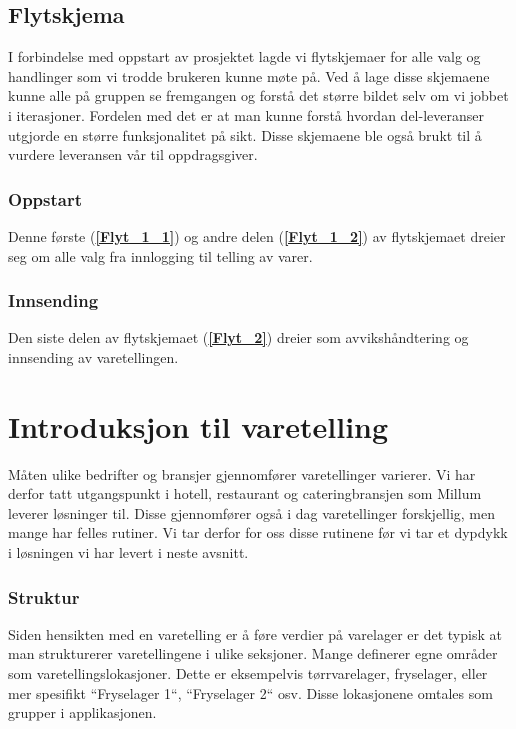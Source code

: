 \subsection{\textbf{Flytskjema}}
I forbindelse med oppstart av prosjektet lagde vi flytskjemaer for alle valg og handlinger som vi trodde brukeren kunne møte på. Ved å lage disse skjemaene kunne alle på gruppen se fremgangen og forstå det større bildet selv om vi jobbet i iterasjoner. Fordelen med det er at man kunne forstå hvordan del-leveranser utgjorde en større funksjonalitet på sikt. Disse skjemaene ble også brukt til å vurdere leveransen vår til oppdragsgiver.

\subsubsection{\textbf{Oppstart}}
Denne første (\textbf{\ref{Flyt_1_1}}) og andre delen (\textbf{\ref{Flyt_1_2}}) av flytskjemaet  dreier seg om alle valg  fra innlogging til telling av varer.

\subsubsection{\textbf{Innsending}}
Den siste delen av flytskjemaet (\textbf{\ref{Flyt_2}}) dreier som avvikshåndtering og innsending av varetellingen.

\section{\textbf{Introduksjon til varetelling}}

Måten ulike bedrifter og bransjer gjennomfører varetellinger varierer. Vi har derfor tatt utgangspunkt i hotell, restaurant og cateringbransjen som Millum leverer løsninger til. Disse gjennomfører også i dag varetellinger forskjellig, men mange har felles rutiner. Vi tar derfor for oss disse rutinene før vi tar et dypdykk i løsningen vi har levert i neste avsnitt.

\subsubsection{\textbf{Struktur}}
Siden hensikten med en varetelling er å føre verdier på varelager er det typisk at man strukturerer varetellingene i ulike seksjoner. Mange definerer egne områder som varetellingslokasjoner. Dette er eksempelvis tørrvarelager, fryselager, eller mer spesifikt ``Fryselager 1``, ``Fryselager 2`` osv. Disse lokasjonene omtales som grupper i applikasjonen.

